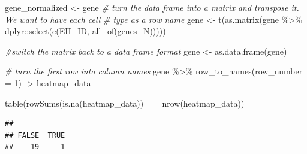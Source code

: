\documentclass[
]{article}
\newenvironment{Shaded}{\begin{snugshade}}{\end{snugshade}}
\newcommand{\AttributeTok}[1]{\textcolor[rgb]{0.77,0.63,0.00}{#1}}
\newcommand{\CommentTok}[1]{\textcolor[rgb]{0.56,0.35,0.01}{\textit{#1}}}
\newcommand{\DecValTok}[1]{\textcolor[rgb]{0.00,0.00,0.81}{#1}}
\newcommand{\FunctionTok}[1]{\textcolor[rgb]{0.00,0.00,0.00}{#1}}
\newcommand{\NormalTok}[1]{#1}
\newcommand{\OtherTok}[1]{\textcolor[rgb]{0.56,0.35,0.01}{#1}}
\newcommand{\SpecialCharTok}[1]{\textcolor[rgb]{0.00,0.00,0.00}{#1}}
\begin{document}
\begin{Shaded}
\begin{Highlighting}[]
\NormalTok{gene\_normalized }\OtherTok{\textless{}{-}}\NormalTok{ gene}
\CommentTok{\# turn the data frame into a matrix and transpose it. We want to have each cell }
 \CommentTok{\# type as a row name }
\NormalTok{ gene }\OtherTok{\textless{}{-}} \FunctionTok{t}\NormalTok{(}\FunctionTok{as.matrix}\NormalTok{(gene }\SpecialCharTok{\%\textgreater{}\%}\NormalTok{ dplyr}\SpecialCharTok{::}\FunctionTok{select}\NormalTok{(}\FunctionTok{c}\NormalTok{(EH\_ID, }\FunctionTok{all\_of}\NormalTok{(genes\_N)))))}
 
 \CommentTok{\#switch the matrix back to a data frame format}
\NormalTok{ gene }\OtherTok{\textless{}{-}} \FunctionTok{as.data.frame}\NormalTok{(gene)}
 
 \CommentTok{\# turn the first row into column names}
\NormalTok{ gene }\SpecialCharTok{\%\textgreater{}\%}
     \FunctionTok{row\_to\_names}\NormalTok{(}\AttributeTok{row\_number =} \DecValTok{1}\NormalTok{) }\OtherTok{{-}\textgreater{}}\NormalTok{ heatmap\_data}
 
 \FunctionTok{table}\NormalTok{(}\FunctionTok{rowSums}\NormalTok{(}\FunctionTok{is.na}\NormalTok{(heatmap\_data)) }\SpecialCharTok{==} \FunctionTok{nrow}\NormalTok{(heatmap\_data))}
\end{Highlighting}
\end{Shaded}

\begin{verbatim}
## 
## FALSE  TRUE 
##    19     1
\end{verbatim}
\end{document}

